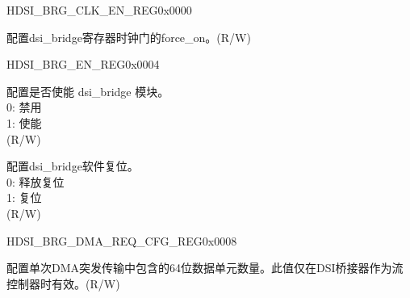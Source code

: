 \begin{register}{H}{DSI\_BRG\_CLK\_EN\_REG}{0x0000}\label{regdesc:DSIBRGCLKENREG}
%
%
\regnewline%
\begin{regdesc}\begin{reglist}
\label{fielddesc:DSIBRGCLKEN}\item [DSI\_BRG\_CLK\_EN] 配置dsi\_bridge寄存器时钟门的force\_on。(R/W)
\end{reglist}\end{regdesc}
\end{register}


\begin{register}{H}{DSI\_BRG\_EN\_REG}{0x0004}\label{regdesc:DSIBRGENREG}
%
%
%
\regnewline%
\begin{regdesc}\begin{reglist}
\label{fielddesc:DSIBRGDSIEN}\item [DSI\_BRG\_DSI\_EN] 配置是否使能 dsi\_bridge 模块。\\0: 禁用\\1: 使能 \\(R/W)
\label{fielddesc:DSIBRGDSIBRIGRST}\item [DSI\_BRG\_DSI\_BRIG\_RST] 配置dsi\_bridge软件复位。\\0: 释放复位\\1: 复位 \\(R/W)
\end{reglist}\end{regdesc}
\end{register}


\begin{register}{H}{DSI\_BRG\_DMA\_REQ\_CFG\_REG}{0x0008}\label{regdesc:DSIBRGDMAREQCFGREG}
%
%
\regnewline%
\begin{regdesc}\begin{reglist}
\label{fielddesc:DSIBRGDMABURSTLEN}\item [DSI\_BRG\_DMA\_BURST\_LEN] 配置单次DMA突发传输中包含的64位数据单元数量。此值仅在DSI桥接器作为流控制器时有效。(R/W)
\end{reglist}\end{regdesc}
\end{register}


